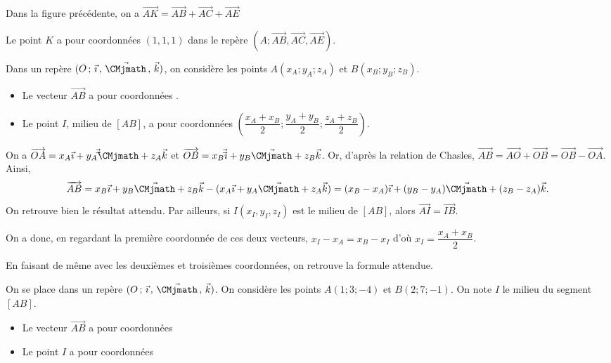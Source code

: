 \documentclass[11pt,fleqn, openany]{book} %
\begin{document}
\begin{example}Dans la figure précédente, on a  $\overrightarrow{AK}=\overrightarrow{AB}+\overrightarrow{AC}+\overrightarrow{AE}$ 

Le point $K$ a pour coordonnées $(1,1,1)$ dans le repère $(A;\overrightarrow{AB}, \overrightarrow{AC}, \overrightarrow{AE})$.
\end{example}

\begin{proposition}Dans un repère  $\Oijk$, on considère les points $A(x_A;y_A;z_A)$ et $B(x_B;y_B;z_B)$.
\begin{itemize}
\item Le vecteur $\overrightarrow{AB}$ a pour coordonnées \renewcommand{\arraystretch}{1}.
\item Le point $I$, milieu de $[AB]$, a pour coordonnées $\left( \dfrac{x_A+x_B}{2} ; \dfrac{y_A+y_B}{2} ; \dfrac{z_A+z_B}{2} \right)$.
\end{itemize}\end{proposition}

\begin{demonstration}On a $\overrightarrow{OA}=x_A\vec {\imath} + y_A \vec \vec {\CMjmath} + z_A \vec k$ et $\overrightarrow{OB}=x_B\vec \vec {\imath} + y_B \vec {\CMjmath} + z_B \vec k$. Or, d'après la relation de Chasles, $\overrightarrow{AB}=\overrightarrow{AO}+\overrightarrow{OB}=\overrightarrow{OB}- \overrightarrow{OA}$. Ainsi,
\[\overrightarrow{AB} = x_B\vec {\imath} + y_B \vec {\CMjmath} + z_B \vec k - (x_A\vec {\imath} + y_A \vec {\CMjmath} + z_A \vec k)=(x_B-x_A)\vec {\imath} + (y_B-y_A)\vec {\CMjmath} + (z_B - z_A)\vec k.\]
On retrouve bien le résultat attendu. Par ailleurs, si $I(x_I,y_I,z_I)$ est le milieu de $[AB]$, alors $\overrightarrow{AI}=\overrightarrow{IB}$. 

On a donc, en regardant la première coordonnée de ces deux vecteurs, $x_I - x_A = x_B - x_I$ d'où $x_I=\dfrac{x_A+x_B}{2}$. 

En faisant de même avec les deuxièmes et troisièmes coordonnées, on retrouve la formule attendue.\end{demonstration}

\begin{example}On se place dans un repère $\Oijk$. On considère les points $A(1;3;-4)$ et $B(2;7;-1)$. On note $I$ le milieu du segment $[AB]$.
\begin{itemize}
\item Le vecteur $\overrightarrow{AB}$ a pour coordonnées 
\vskip15pt
\item Le point $I$ a pour coordonnées 
\vskip15pt
\end{itemize}\end{example}
\end{document}
